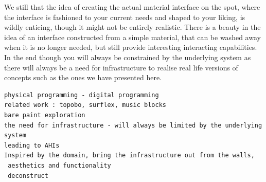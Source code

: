 
We still  that the idea of creating the actual material interface on the spot, where the interface is fashioned to your current needs and shaped to your liking, is wildly enticing, though it might not be entirely realistic.
There is a beauty in the idea of an interface constructed from a simple material, that can be washed away when it is no longer needed, but still provide interesting interacting capabilities.
In the end though you will always be constrained by the underlying system as there will always be a need for infrastructure to realise real life versions of concepts such as the ones we have presented here.

\begin{verbatim}
physical programming - digital programming
related work : topobo, surflex, music blocks
bare paint exploration
the need for infrastructure - will always be limited by the underlying system
leading to AHIs
Inspired by the domain, bring the infrastructure out from the walls,
 aesthetics and functionality
 deconstruct
\end{verbatim}